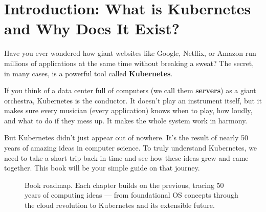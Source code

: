 \chapter{Introduction: What is Kubernetes and Why Does It Exist?}


Have you ever wondered how giant websites like Google, Netflix, or Amazon run millions of applications at the same time without breaking a sweat? The secret, in many cases, is a powerful tool called \textbf{Kubernetes}.

If you think of a data center full of computers (we call them \textbf{servers}) as a giant orchestra, Kubernetes is the conductor. It doesn't play an instrument itself, but it makes sure every musician (every application) knows when to play, how loudly, and what to do if they mess up. It makes the whole system work in harmony.

But Kubernetes didn't just appear out of nowhere. It's the result of nearly 50 years of amazing ideas in computer science. To truly understand Kubernetes, we need to take a short trip back in time and see how these ideas grew and came together. This book will be your simple guide on that journey.

\begin{figure}[htbp]
\centering

\caption{Book roadmap. Each chapter builds on the previous, tracing 50 years of computing ideas --- from foundational OS concepts through the cloud revolution to Kubernetes and its extensible future.}
\label{fig:S_1}
\end{figure}
